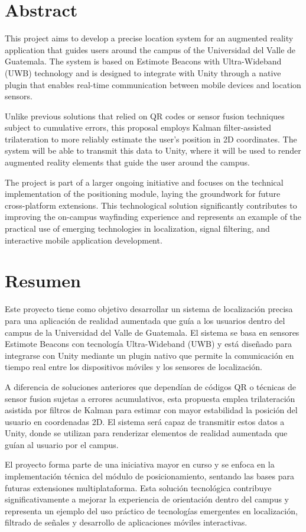 \documentclass{article}
\begin{document}
\section{Abstract}
{\justify This project aims to develop a precise location system for an augmented reality application that guides users around the campus of the Universidad del Valle de Guatemala. The system is based on Estimote Beacons with Ultra-Wideband (UWB) technology and is designed to integrate with Unity through a native plugin that enables real-time communication between mobile devices and location sensors.

Unlike previous solutions that relied on QR codes or sensor fusion techniques subject to cumulative errors, this proposal employs Kalman filter-assisted trilateration to more reliably estimate the user's position in 2D coordinates. The system will be able to transmit this data to Unity, where it will be used to render augmented reality elements that guide the user around the campus.

The project is part of a larger ongoing initiative and focuses on the technical implementation of the positioning module, laying the groundwork for future cross-platform extensions. This technological solution significantly contributes to improving the on-campus wayfinding experience and represents an example of the practical use of emerging technologies in localization, signal filtering, and interactive mobile application development.}

\section{Resumen}
{\justify
Este proyecto tiene como objetivo desarrollar un sistema de localización precisa para una aplicación de realidad aumentada que guía a los usuarios dentro del campus de la Universidad del Valle de Guatemala. El sistema se basa en sensores Estimote Beacons con tecnología Ultra-Wideband (UWB) y está diseñado para integrarse con Unity mediante un plugin nativo que permite la comunicación en tiempo real entre los dispositivos móviles y los sensores de localización.

A diferencia de soluciones anteriores que dependían de códigos QR o técnicas de sensor fusion sujetas a errores acumulativos, esta propuesta emplea trilateración asistida por filtros de Kalman para estimar con mayor estabilidad la posición del usuario en coordenadas 2D. El sistema será capaz de transmitir estos datos a Unity, donde se utilizan para renderizar elementos de realidad aumentada que guían al usuario por el campus.

El proyecto forma parte de una iniciativa mayor en curso y se enfoca en la implementación técnica del módulo de posicionamiento, sentando las bases para futuras extensiones multiplataforma. Esta solución tecnológica contribuye significativamente a mejorar la experiencia de orientación dentro del campus y representa un ejemplo del uso práctico de tecnologías emergentes en localización, filtrado de señales y desarrollo de aplicaciones móviles interactivas.
}
\end{document}
